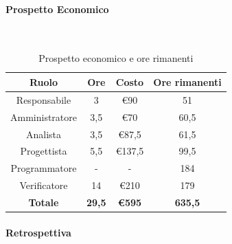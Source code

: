 \documentclass{article}
\begin{document}
                \paragraph{Prospetto Economico}\mbox{}\\
                \begin{table}[H]
                    \centering
                    \begin{tabular}{|c|c|c|c|}
                    \hline
                    \textbf{Ruolo}  & \textbf{Ore}  & \textbf{Costo} & \textbf{Ore rimanenti} \\ \hline
                    Responsabile    & 3             & €90            & 51                     \\ \hline
                    Amministratore  & 3,5           & €70            & 60,5                   \\ \hline
                    Analista        & 3,5           & €87,5          & 61,5                   \\ \hline
                    Progettista     & 5,5           & €137,5         & 99,5                   \\ \hline
                    Programmatore   & -            & -           & 184                    \\ \hline
                    Verificatore    & 14            & €210           & 179                    \\ \hline
                    \textbf{Totale} & \textbf{29,5} & \textbf{\euro595}   & \textbf{635,5}         \\ \hline
                    \end{tabular}
                    \caption{Prospetto economico e ore rimanenti}
                \end{table}

                \paragraph{Retrospettiva}
\end{document}
